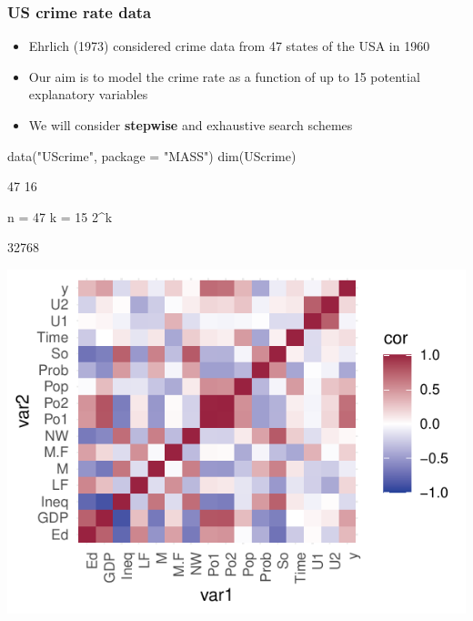 \documentclass[a4paper]{article}
\begin{document}
\subsubsection{US crime rate data}
\begin{itemize}
	\item Ehrlich (1973) considered crime data from 47 states of the USA in 1960
	\item Our aim is to model the crime rate as a function of up to 15 potential explanatory variables
	\item We will consider \textcolor{myblue}{\textbf{stepwise}} and exhaustive search schemes
\end{itemize}
\begin{Schunk}
\begin{Sinput}
data("UScrime", package = "MASS")
dim(UScrime)
\end{Sinput}
\begin{Soutput}
[1] 47 16
\end{Soutput}
\begin{Sinput}
n = 47
k = 15
2^k
\end{Sinput}
\begin{Soutput}
[1] 32768
\end{Soutput}


{\centering \includegraphics[width=\maxwidth]{figure/listings-unnamed-chunk-386-1} 

}

\end{Schunk}
\end{document}
